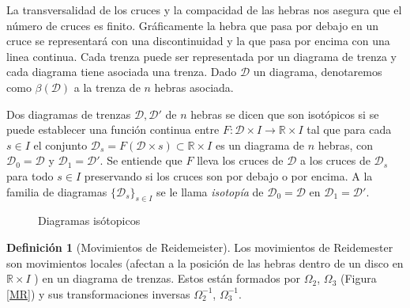 \documentclass[12pt]{article}
\theoremstyle{definition}
\newtheorem{defi}{Definición}[section]
\begin{document}
La transversalidad de los cruces y la compacidad de las hebras nos asegura que el número de cruces es finito. Gráficamente la hebra que pasa por debajo en un cruce se representará con una discontinuidad y la que pasa por encima con una linea continua. Cada trenza puede ser representada por un diagrama de trenza y cada diagrama tiene asociada una trenza. Dado $\mathcal{D}$ un diagrama, denotaremos como $\beta(\mathcal{D})$ a la trenza de $n$ hebras asociada.

Dos diagramas de trenzas $\mathcal{D}, \mathcal{D}'$ de $n$ hebras se dicen que son isotópicos si se puede establecer una función continua entre $F:\mathcal{D}\times I\rightarrow\mathbb{R}\times I$ tal que para cada $s\in I$ el conjunto $\mathcal{D}_s = F(\mathcal{D}\times s)\subset\mathbb{R}\times I$ es un diagrama de $n$ hebras, con $\mathcal{D}_0 = \mathcal{D}$ y $\mathcal{D}_1 = \mathcal{D}'$. Se entiende que $F$ lleva los cruces de $\mathcal{D}$ a los cruces de $\mathcal{D}_s$ para todo $s\in I$ preservando si los cruces son por debajo o por encima. A la familia de diagramas $\{\mathcal{D}_s\}_{s\in I}$ se le llama \textit{isotopía} de $\mathcal{D}_0 = \mathcal{D}$ en $\mathcal{D}_1 = \mathcal{D}'$.




\begin{figure}[h!]
\centering
{}
\caption{Diagramas isótopicos}
\label{fig:d_iso}
\end{figure}







\begin{defi}[Movimientos de Reidemeister]  Los movimientos de Reidemester  son movimientos locales (afectan a la posición de las hebras dentro de un disco en 
$ \mathbb{R}\times I $ ) en un diagrama de trenzas. Estos están formados por $\Omega_2$, $\Omega_3$ (Figura \ref{MR}) y sus transformaciones inversas
$\Omega_2^{-1}$, $\Omega_3^{-1}$. 

\end{defi}
\end{document}

